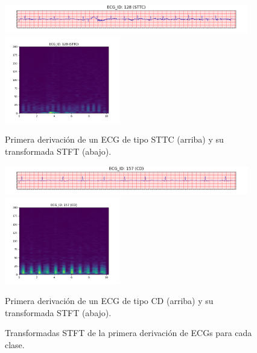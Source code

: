 \begin{figure}[t]\ContinuedFloat
	\centering
	\includegraphics[width=0.95\textwidth]{Imagenes/Vectorial/Transformadas/STTC/ecg.png}
	\includegraphics[width=0.45\textwidth]{Imagenes/Vectorial/Transformadas/STTC/stft.png}
	\par Primera derivación de un ECG de tipo STTC (arriba) y su transformada STFT (abajo).
	\vspace{1cm}
		
	\includegraphics[width=0.95\textwidth]{Imagenes/Vectorial/Transformadas/CD/ecg.png}
	\includegraphics[width=0.45\textwidth]{Imagenes/Vectorial/Transformadas/CD/stft.png}
	\par Primera derivación de un ECG de tipo CD (arriba) y su transformada STFT (abajo).
	\caption{Transformadas STFT de la primera derivación de ECGs para cada clase.}
\end{figure}
